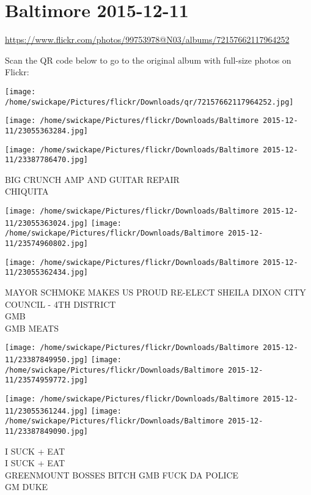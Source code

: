 \documentclass[10pt,letterpaper]{article}
\title{}
\author{}
\date{}
\begin{document}
\section*{Baltimore 2015-12-11}

\url{https://www.flickr.com/photos/99753978@N03/albums/72157662117964252}

Scan the QR code below to go to the original album with full-size photos on Flickr:

\texttt{[image: /home/swickape/Pictures/flickr/Downloads/qr/72157662117964252.jpg]}
\pagebreak

\texttt{[image: /home/swickape/Pictures/flickr/Downloads/Baltimore 2015-12-11/23055363284.jpg]}

\vspace{0.25in}
\texttt{[image: /home/swickape/Pictures/flickr/Downloads/Baltimore 2015-12-11/23387786470.jpg]}

BIG CRUNCH AMP AND GUITAR REPAIR\\
CHIQUITA
\pagebreak

\texttt{[image: /home/swickape/Pictures/flickr/Downloads/Baltimore 2015-12-11/23055363024.jpg]}
\texttt{[image: /home/swickape/Pictures/flickr/Downloads/Baltimore 2015-12-11/23574960802.jpg]}

\vspace{0.25in}
\texttt{[image: /home/swickape/Pictures/flickr/Downloads/Baltimore 2015-12-11/23055362434.jpg]}

MAYOR SCHMOKE MAKES US PROUD RE{-}ELECT SHEILA DIXON CITY COUNCIL {-} 4TH DISTRICT\\
GMB\\
GMB MEATS
\pagebreak

\texttt{[image: /home/swickape/Pictures/flickr/Downloads/Baltimore 2015-12-11/23387849950.jpg]}
\texttt{[image: /home/swickape/Pictures/flickr/Downloads/Baltimore 2015-12-11/23574959772.jpg]}

\texttt{[image: /home/swickape/Pictures/flickr/Downloads/Baltimore 2015-12-11/23055361244.jpg]}
\texttt{[image: /home/swickape/Pictures/flickr/Downloads/Baltimore 2015-12-11/23387849090.jpg]}

I SUCK + EAT\\
I SUCK + EAT\\
GREENMOUNT BOSSES BITCH GMB FUCK DA POLICE\\
GM DUKE
\pagebreak
\end{document}
